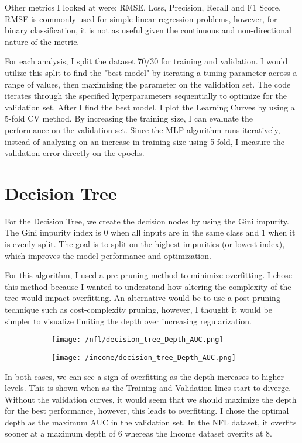 \documentclass[12pt]{article}
\begin{document}
Other metrics I looked at were: RMSE, Loss, Precision, Recall and F1 Score.  RMSE is commonly used for simple linear regression problems, however, for binary classification, it is not as useful given the continuous and non-directional nature of the metric.

For each analysis, I split the dataset 70/30 for training and validation. I would utilize this split to find the "best model" by iterating a tuning parameter across a range of values, then maximizing the parameter on the validation set. The code iterates through the specified hyperparameters sequentially to optimize for the validation set. After I find the best model, I plot the Learning Curves by using a 5-fold CV method. By increasing the training size, I can evaluate the performance on the validation set. Since the MLP algorithm runs iteratively, instead of analyzing on an increase in training size using 5-fold, I measure the validation error directly on the epochs.

\section{Decision Tree}
For the Decision Tree, we create the decision nodes by using the Gini impurity.  The Gini impurity index is 0 when all inputs are in the same class and 1 when it is evenly split.  The goal is to split on the highest impurities (or lowest index), which improves the model performance and optimization.

For this algorithm, I used a pre-pruning method to minimize overfitting.  I chose this method because I wanted to understand how altering the complexity of the tree would impact overfitting. An alternative would be to use a post-pruning technique such as cost-complexity pruning, however, I thought it would be simpler to visualize limiting the depth over increasing regularization.

\begin{figure}[H]
\begin{subfigure}{0.5\textwidth}
\centering
\texttt{[image: /nfl/decision\_tree\_Depth\_AUC.png]}
\end{subfigure}%
\begin{subfigure}{0.5\textwidth}
\centering
\texttt{[image: /income/decision\_tree\_Depth\_AUC.png]}
\end{subfigure}
\end{figure}

In both cases, we can see a sign of overfitting as the depth increases to higher levels. This is shown when as the Training and Validation lines start to diverge. Without the validation curves, it would seem that we should maximize the depth for the best performance, however, this leads to overfitting. I chose the optimal depth as the maximum AUC in the validation set. In the NFL dataset, it overfits sooner at a maximum depth of 6 whereas the Income dataset overfits at 8. 
\end{document}
